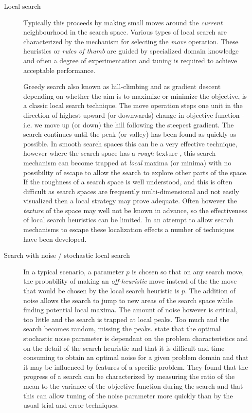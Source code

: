 \begin{description}
\item[Local search]
Typically this proceeds by making small moves around the \emph{current} neighbourhood in the search space. Various types of local search are characterized by the mechanism for selecting the \emph{move} operation. These heuristics or \emph{rules of thumb} are guided by specialized domain knowledge and often a degree of experimentation and tuning is required to achieve acceptable performance.

Greedy search also known as hill-climbing and as gradient descent depending on whether the aim is to maximize or minimize the objective, is a classic local search technique. The move operation steps one unit in the direction of highest upward (or downwards) change in objective function - i.e. we move up (or down) the hill following the steepest gradient. The search continues until the peak (or valley) has been found as quickly as possible. In smooth search spaces this can be a very effective technique, however where the search space has a \emph{rough} texture \citep{beck97texturebased, fox89constrained}, this search mechanism can become trapped at \emph{local} maxima (or minima) with no possibility of escape to allow the search to explore other parts of the space. If the roughness of a search space is well understood, and this is often difficult as search spaces are frequently multi-dimensional and not easily visualized then a local strategy may prove adequate. Often however the \emph{texture} of the space may well not be known in advance, so the effectiveness of local search heuristics can be limited. In an attempt to allow search mechanisms to escape these localization effects a number of techniques have been developed.

\item[Search with noise / stochastic local search]
In a typical scenario, a parameter $p$ is chosen so that on any search move, the probability of making an \emph{off-heuristic} move instead of the the move that would be chosen by the local search heuristic is $p$. The addition of noise allows the search to jump to new areas of the search space while finding potential local maxima. The amount of noise however is critical, too little and the search is trapped at local peaks. Too much and the search becomes random, missing the peaks. \citet{mcallester97evidence} state that the optimal stochastic noise parameter is dependant on the problem characteristics and on the detail of the search heuristic and that it is difficult and time-consuming to obtain an optimal noise for a given problem domain and that it may be influenced by features of a specific problem. They found that the progress of a search can be characterized by measuring the ratio of the mean to the variance of the objective function during the search and that this can allow tuning of the noise parameter more quickly than by the usual trial and error techniques.


\end{description}
